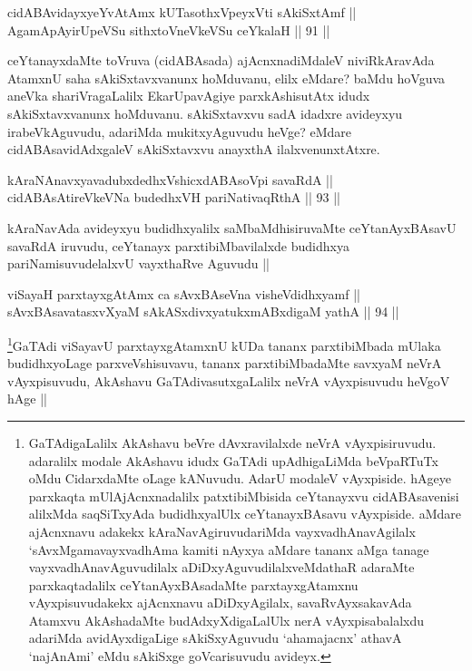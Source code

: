 
\begin{shl}
cidABAvidayxyeYvA\s \s tAmx kUTasothxV\s peyxVti sAkiSxtAmf || \\
AgamApAyirUpeVSu sithxtoV\s neVkeVSu ceYkalaH ||  91 ||  
\end{shl}

\begin{artha}
ceYtanayxdaMte toVruva (cidABAsada) ajAcnxnadiMdaleV niviRkAravAda AtamxnU saha sAkiSxtavxvanunx hoMduvanu, elilx eMdare? baMdu hoVguva aneVka shariVragaLalilx EkarUpavAgiye parxkAshisutAtx idudx sAkiSxtavxvanunx hoMduvanu. sAkiSxtavxvu sadA idadxre avideyxyu irabeVkAguvudu, adariMda mukitxyAguvudu heVge? eMdare cidABAsavidAdxgaleV sAkiSxtavxvu anayxthA ilalxvenunxtAtxre. 
\end{artha}

\begin{shl}
kAraNAnavxyavadubxdedhxVshicxdABAsoV\s pi savaRdA || \\
cidABAsAtireVkeVNa budedhxVH pariNativaqRthA ||  93 ||  
\end{shl}

\begin{artha}
kAraNavAda avideyxyu budidhxyalilx saMbaMdhisiruvaMte ceYtanAyxBAsavU savaRdA iruvudu, ceYtanayx parxtibiMbavilalxde budidhxya pariNamisuvudelalxvU vayxthaRve Aguvudu ||
\end{artha}


\begin{shl}
viSayaH parxtayxgAtAmx ca sAvxBAseVna visheVdidhxyamf || \\
sAvxBAsavatasxvXyaM sAkASxdivxyatukxmABxdigaM yathA || 94 ||  
\end{shl}

\begin{artha}
\footnote{GaTAdigaLalilx AkAshavu beVre dAvxravilalxde neVrA vAyxpisiruvudu. adaralilx modale AkAshavu idudx GaTAdi upAdhigaLiMda beVpaRTuTx oMdu CidarxdaMte oLage kANuvudu. AdarU modaleV vAyxpiside. hAgeye parxkaqta mUlAjAcnxnadalilx patxtibiMbisida ceYtanayxvu cidABAsavenisi alilxMda saqSiTxyAda budidhxyalUlx ceYtanayxBAsavu vAyxpiside. aMdare ajAcnxnavu adakekx kAraNavAgiruvudariMda vayxvadhAnavAgilalx `sAvxMgamavayxvadhAma kamiti nAyxya aMdare tananx aMga tanage vayxvadhAnavAguvudilalx aDiDxyAguvudilalxveMdathaR adaraMte parxkaqtadalilx ceYtanAyxBAsadaMte parxtayxgAtamxnu vAyxpisuvudakekx ajAcnxnavu aDiDxyAgilalx, savaRvAyxsakavAda Atamxvu AkAshadaMte budAdxyXdigaLalUlx nerA vAyxpisabalalxdu adariMda avidAyxdigaLige sAkiSxyAguvudu `ahamajacnx' athavA `najAnAmi' eMdu sAkiSxge goVcarisuvudu avideyx.}GaTAdi viSayavU parxtayxgAtamxnU kUDa tananx parxtibiMbada mUlaka budidhxyoLage parxveVshisuvavu, tananx parxtibiMbadaMte savxyaM neVrA vAyxpisuvudu, AkAshavu GaTAdivasutxgaLalilx neVrA vAyxpisuvudu heVgoV hAge ||
\end{artha}

